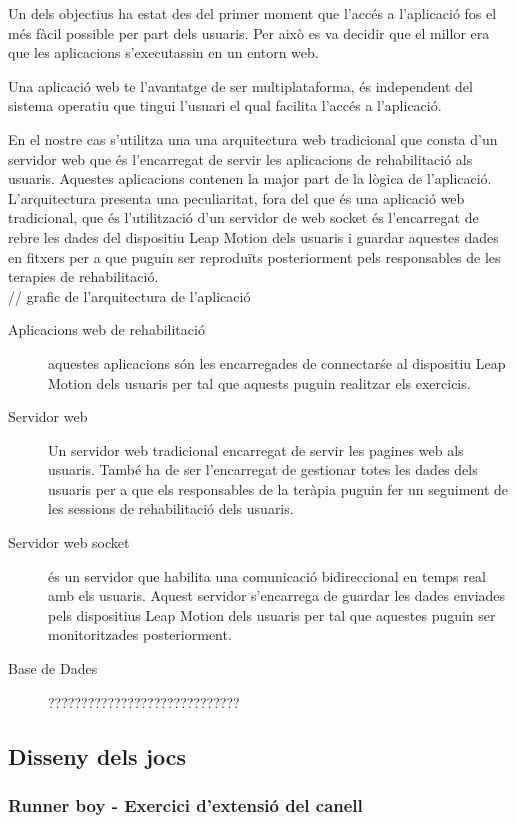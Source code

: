 \documentclass[12pt,a4paper,catalan]{article}
\begin{document}
	Un dels objectius ha estat des del primer moment que l’accés a l’aplicació fos el més fàcil possible per part dels usuaris. Per això es va decidir que el millor era que les aplicacions s’executassin en un entorn web.
	
	Una aplicació web te l’avantatge de ser multiplataforma, és independent del sistema operatiu que tingui l’usuari el qual facilita l’accés a l’aplicació.
	
	En el nostre cas s’utilitza una una arquitectura web tradicional que consta d’un servidor web que és l’encarregat de servir les aplicacions de rehabilitació als usuaris. Aquestes aplicacions contenen la major part de la lògica de l’aplicació. L’arquitectura presenta una peculiaritat, fora del que és una aplicació web tradicional, que és l’utilització d’un servidor de web socket és l’encarregat de rebre les dades del dispositiu Leap Motion dels usuaris i guardar aquestes dades en fitxers per a que puguin ser reproduïts posteriorment pels responsables de les terapies de rehabilitació.\\
	
	// grafic de l’arquitectura de l’aplicació
	
	\begin{description}
		\item [Aplicacions web de rehabilitació] aquestes aplicacions són les encarregades de connectarśe al dispositiu Leap Motion dels usuaris per tal que aquests puguin realitzar els exercicis.
		\item [Servidor web] Un servidor web tradicional encarregat de servir les pagines web als usuaris. També ha de ser l’encarregat de gestionar totes les dades dels usuaris per a que els responsables de la teràpia puguin fer un seguiment de les sessions de rehabilitació dels usuaris.
		\item [Servidor web socket] és un servidor que habilita una comunicació bidireccional en temps real amb els usuaris. Aquest servidor s’encarrega de guardar les dades enviades pels dispositius Leap Motion dels usuaris per tal que aquestes puguin ser monitoritzades posteriorment.
		\item [Base de Dades] ?????????????????????????????
	\end{description}
	\subsection{Disseny dels jocs}
	\subsubsection{Runner boy - Exercici d'extensió del canell}
\end{document}
